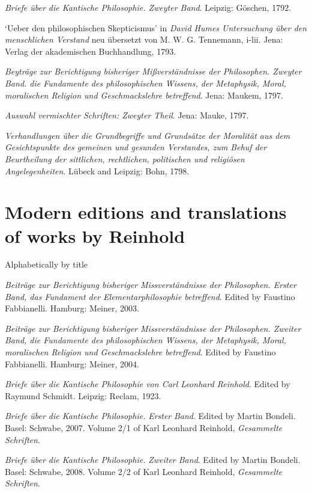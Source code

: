 \textit{Briefe \"{u}ber die Kantische Philosophie. Zweyter Band}. Leipzig: G\"{o}schen, 1792. 

`Ueber den philosophischen Skepticismus' in \textit{David Humes Untersuchung \"{u}ber den menschlichen Verstand} neu \"{u}bersetzt von M. W. G. Tennemann, i{-}lii. Jena: Verlag der akademischen Buchhandlung, 1793.

\textit{Beytr\"{a}ge zur Berichtigung bisheriger Mi\ss{}verst\"{a}ndnisse der Philosophen. Zweyter Band. die Fundamente des philosophischen Wissens, der Metaphysik, Moral, moralischen Religion und Geschmackslehre betreffend}. Jena: Maukem, 1797. 

\textit{Auswahl vermischter Schriften: Zweyter Theil}. Jena: Mauke, 1797.

\textit{Verhandlungen \"{u}ber die Grundbegriffe und Grunds\"{a}tze der Moralit\"{a}t aus dem Gesichtspunkte des gemeinen und gesunden Verstandes, zum Behuf der Beurtheilung der sittlichen, rechtlichen, politischen und religi\"{o}sen Angelegenheiten}. L\"{u}beck and Leipzig: Bohn, 1798.


\section{Modern editions and translations of works by Reinhold}


Alphabetically by title

\textit{Beitr\"{a}ge zur Berichtigung bisheriger Missverst\"{a}ndnisse der Philosophen. Erster Band, das Fundament der Elementarphilosophie betreffend}. Edited by Faustino Fabbianelli. Hamburg: Meiner, 2003.

\textit{Beitr\"{a}ge zur Berichtigung bisheriger Missverst\"{a}ndnisse der Philosophen. Zweiter Band, die Fundamente des philosophischen Wissens, der Metaphysik, Moral, moralischen Religion und Geschmackslehre betreffend}. Edited by Faustino Fabbianelli. Hamburg: Meiner, 2004.

\textit{Briefe \"{u}ber die Kantische Philosophie von Carl Leonhard Reinhold}. Edited by Raymund Schmidt. Leipzig: Reclam, 1923. 

\textit{Briefe \"{u}ber die Kantische Philosophie.} \textit{Erster} \textit{Band}. Edited by Martin Bondeli. Basel: Schwabe, 2007. Volume 2/1 of Karl Leonhard Reinhold, \textit{Gesammelte Schriften}.

\textit{Briefe \"{u}ber die Kantische Philosophie.} \textit{Zweiter Band}. Edited by Martin Bondeli. Basel: Schwabe, 2008. Volume 2/2 of Karl Leonhard Reinhold, \textit{Gesammelte Schriften}.

